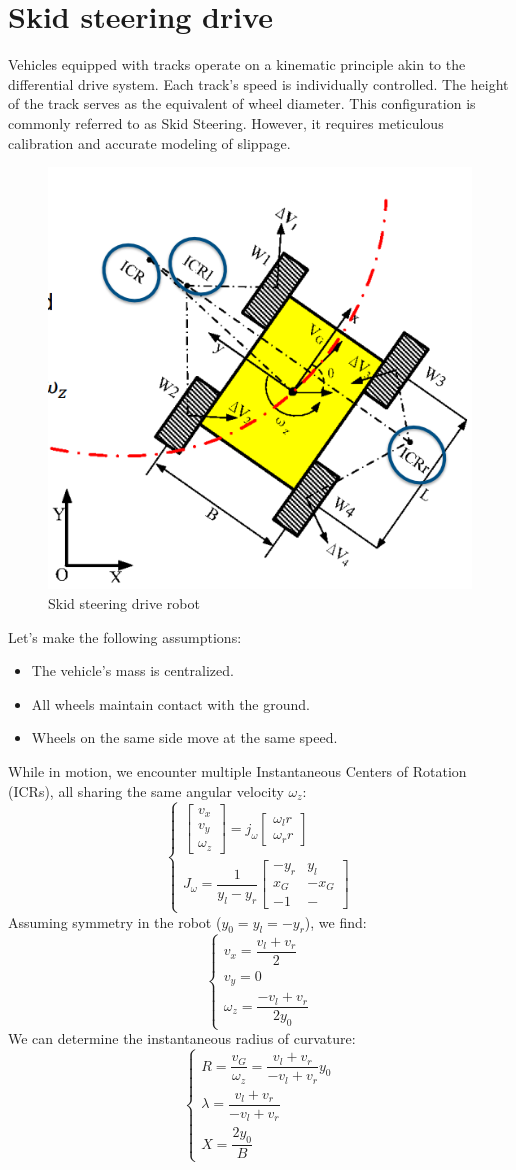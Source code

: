 \section{Skid steering drive}

Vehicles equipped with tracks operate on a kinematic principle akin to the differential drive system. 
Each track's speed is individually controlled. 
The height of the track serves as the equivalent of wheel diameter.
This configuration is commonly referred to as Skid Steering. 
However, it requires meticulous calibration and accurate modeling of slippage.
\begin{figure}[H]
    \centering
    \includegraphics[width=0.25\linewidth]{images/skid.png} 
    \caption{Skid steering drive robot}
\end{figure}
Let's make the following assumptions:
\begin{itemize}
    \item The vehicle's mass is centralized.
    \item All wheels maintain contact with the ground.
    \item Wheels on the same side move at the same speed.
\end{itemize}
While in motion, we encounter multiple Instantaneous Centers of Rotation (ICRs), all sharing the same angular velocity $\omega_z$:
\[\begin{cases}
    \begin{bmatrix}
        v_x \\
        v_y \\
        \omega_z
    \end{bmatrix}= j_\omega\begin{bmatrix}
        \omega_lr \\
        \omega_rr
    \end{bmatrix} \\
    J_\omega=\dfrac{1}{y_l-y_r}\begin{bmatrix}
        -y_r & y_l \\
        x_G & -x_G \\
        -1 & -
    \end{bmatrix}
\end{cases}\]
Assuming symmetry in the robot ($y_0 = y_l = -y_r$), we find:
\[\begin{cases}
    v_x=\dfrac{v_l+v_r}{2} \\
    v_y=0 \\
    \omega_z=\dfrac{-v_l+v_r}{2y_0}
\end{cases}\]
We can determine the instantaneous radius of curvature:
\[\begin{cases}
    R=\dfrac{v_G}{\omega_z}=\dfrac{v_l+v_r}{-v_l+v_r}y_0 \\
    \lambda=\dfrac{v_l+v_r}{-v_l+v_r} \\
    X=\dfrac{2y_0}{B}
\end{cases}\]